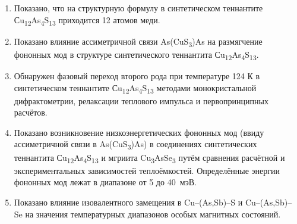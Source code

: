 \begin{enumerate}
						\item Показано, что на структурную формулу в синтетическом теннантите Сu\textsubscript{12}As\textsubscript{4}S\textsubscript{13} приходится 12 атомов меди.
						\item Показано влияние ассиметричной связи As(CuS\textsubscript{3})As на размягчение фононных мод в структуре синтетического теннантита Сu\textsubscript{12}As\textsubscript{4}S\textsubscript{13}.
						\item Обнаружен фазовый переход второго рода при температуре 124 К в синтетическом теннантите Сu\textsubscript{12}As\textsubscript{4}S\textsubscript{13} методами монокристальной дифрактометрии, релаксации теплового импульса и  первопринципных расчётов.
						\item Показано возникновение низкоэнергетических фононных мод (ввиду  ассиметричной связи в As(CuS\textsubscript{3})As) в соединениях синтетических теннантита Сu\textsubscript{12}As\textsubscript{4}S\textsubscript{13} и мгриита Cu\textsubscript{3}AsSe\textsubscript{3} путём сравнения расчётной и экспериментальных зависимостей теплоёмкостей. Определённые энергии  фононных мод  лежат в диапазоне от 5 до 40~мэВ.
						\item Показано влияние изовалентного замещения в Cu--(As,Sb)--S и  Cu--(As,Sb)--Se на значения температурных диапазонов  особых магнитных состояний.

\end{enumerate}
